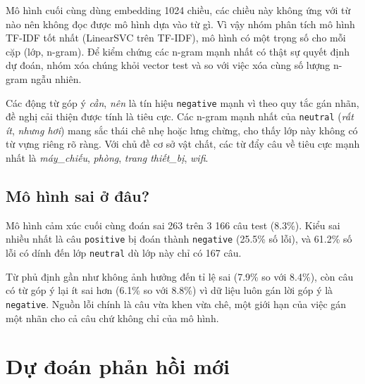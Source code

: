 Mô hình cuối cùng dùng embedding 1024 chiều, các chiều này không ứng với từ nào nên không đọc được mô hình dựa vào từ gì.
Vì vậy nhóm phân tích mô hình TF-IDF tốt nhất (LinearSVC trên TF-IDF), mô hình có một trọng số cho mỗi cặp (lớp,
n-gram). Để kiểm chứng các n-gram mạnh nhất có thật sự quyết định dự đoán, nhóm xóa chúng khỏi vector test và so với
việc xóa cùng số lượng n-gram ngẫu nhiên.


Các động từ góp ý \textit{cần}, \textit{nên} là tín hiệu \texttt{negative} mạnh vì theo quy tắc gán nhãn, đề nghị cải
thiện được tính là tiêu cực. Các n-gram mạnh nhất của \texttt{neutral} (\textit{rất ít}, \textit{nhưng hơi}) mang sắc
thái chê nhẹ hoặc lưng chừng, cho thấy lớp này không có từ vựng riêng rõ ràng. Với chủ đề cơ sở vật chất, các từ đẩy
câu về tiêu cực mạnh nhất là \textit{máy\_chiếu}, \textit{phòng}, \textit{trang thiết\_bị}, \textit{wifi}.

\subsection{Mô hình sai ở đâu?}

Mô hình cảm xúc cuối cùng đoán sai 263 trên 3 166 câu test (8.3\%). Kiểu sai nhiều nhất là câu \texttt{positive} bị
đoán thành \texttt{negative} (25.5\% số lỗi), và 61.2\% số lỗi có dính đến lớp \texttt{neutral} dù lớp này chỉ có 167
câu.


Từ phủ định gần như không ảnh hưởng đến tỉ lệ sai (7.9\% so với 8.4\%), còn câu có từ góp ý lại ít sai hơn (6.1\% so với
8.8\%) vì dữ liệu luôn gán lời góp ý là \texttt{negative}. Nguồn lỗi chính là câu vừa khen vừa chê, một giới hạn của việc
gán một nhãn cho cả câu chứ không chỉ của mô hình.

\section{Dự đoán phản hồi mới}

